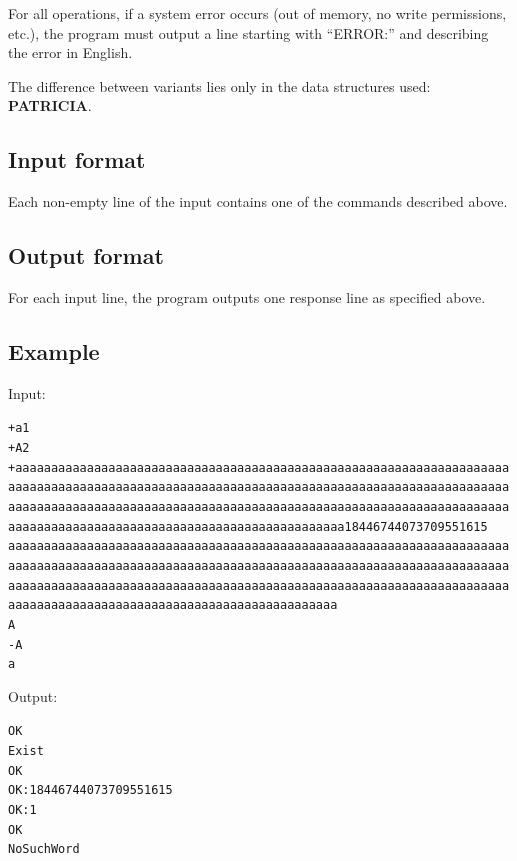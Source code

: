 For all operations, if a system error occurs (out of memory, no write permissions, etc.), the
program must output a line starting with \enquote{ERROR:} and describing the error in English.

The difference between variants lies only in the data structures used: {\bfseries PATRICIA}.

\subsection*{Input format}

Each non-empty line of the input contains one of the commands described above.

\subsection*{Output format}

For each input line, the program outputs one response line as specified above.

\subsection*{Example}

Input:

{\footnotesize
\begin{alltt}
+ a 1
+ A 2
+ aaaaaaaaaaaaaaaaaaaaaaaaaaaaaaaaaaaaaaaaaaaaaaaaaaaaaaaaaaaaaaaa\linebreak{}aaaaaaaaaaaaaaaaaaaaaaaaaaaaaaaaaaaaaaaaaaaaaaaaaaaaaaaaaaaaaaaa\linebreak{}aaaaaaaaaaaaaaaaaaaaaaaaaaaaaaaaaaaaaaaaaaaaaaaaaaaaaaaaaaaaaaaa\linebreak{}aaaaaaaaaaaaaaaaaaaaaaaaaaaaaaaaaaaaaaaaaaaaaaaaaaaaaaaaaaaaaaaa 18446744073709551615
aaaaaaaaaaaaaaaaaaaaaaaaaaaaaaaaaaaaaaaaaaaaaaaaaaaaaaaaaaaaaaaa\linebreak{}aaaaaaaaaaaaaaaaaaaaaaaaaaaaaaaaaaaaaaaaaaaaaaaaaaaaaaaaaaaaaaaa\linebreak{}aaaaaaaaaaaaaaaaaaaaaaaaaaaaaaaaaaaaaaaaaaaaaaaaaaaaaaaaaaaaaaaa\linebreak{}aaaaaaaaaaaaaaaaaaaaaaaaaaaaaaaaaaaaaaaaaaaaaaaaaaaaaaaaaaaaaaaa
A
- A
a
\end{alltt}
}

Output:

{\footnotesize
\begin{alltt}
OK
Exist
OK
OK: 18446744073709551615
OK: 1
OK
NoSuchWord
\end{alltt}
}

\pagebreak
